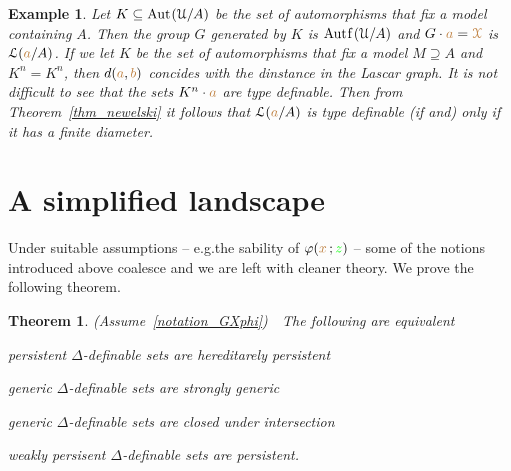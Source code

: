 \documentclass[10pt,openany]{amsproc}
\newcommand{\mylabel}[1]{{\ssf{#1}}\hfill}
\renewenvironment{itemize}
  {\begin{list}{}{%
   \setlength{\parskip}{0mm}
   \setlength{\topsep}{.2\baselineskip}
   \setlength{\rightmargin}{0mm}
   \setlength{\listparindent}{0mm}
   \setlength{\itemindent}{0mm}
   \setlength{\labelwidth}{2ex}
   \setlength{\itemsep}{.1\baselineskip}
   \setlength{\parsep}{0mm}
   \setlength{\partopsep}{0mm}
   \setlength{\labelsep}{1ex}
   \setlength{\leftmargin}{\labelwidth+\labelsep}
   \let\makelabel\mylabel
   }}
   {\vspace*{-.3\baselineskip}\end{list}}
\def\Aut{{\rm Aut\kern.15ex}}
\def\Autf{\mathord{\rm Aut\kern.15ex{f}\kern.15ex}}
\def\X{\EuScript X}
\def\U{\EuScript U}
\def\Ll{\EuScript L}
\def\<{\langle}
\def\>{\rangle}
\def\phi{\varphi}
\def\ssf#1{\textsf{\small #1}}
\newcounter{thm}
\theoremstyle{mio}
\newtheorem{theorem}[thm]{Theorem}\tcolorboxenvironment{theorem}{mythm}
\newtheorem{example}[thm]{Example}\tcolorboxenvironment{example}{mythm}
\def\mr{\color{brown}}
\def\gr{\color{green}}
\def\mrX{{\mr\X}}
\begin{document}


\begin{example}
  Let $K\subseteq\Aut(\U/A)$ be the set of automorphisms that fix a model containing $A$.
  Then the group $G$ generated by $K$ is $\Autf(\U/A)$ and $G\cdot{\mr a}=\mrX$ is $\Ll({\mr a}/A)$.
  If we let $K$ be the set of automorphisms that fix a model $M\supseteq A$ and $K^n=K^n$, then $d({\mr a},{\mr b})$ concides with the dinstance in the Lascar graph.
  It is not difficult to see that the sets $K^n\cdot{\mr a}$ are type definable.
  Then from Theorem~\ref{thm_newelski} it follows that $\Ll({\mr a}/A)$ is type definable (if and) only if it has a finite diameter.
\end{example} 

\section{A simplified landscape}

Under suitable assumptions -- e.g.\@ the sability of $\phi({\mr x}\,;{\gr z})$ -- some of the notions introduced above coalesce and we are left with cleaner theory.
We prove the following theorem.

\begin{theorem}\label{thm_coalesce}
  (Assume~\ref{notation_GXphi})\ \  
  The following are equivalent
  \begin{itemize}
    \item[1.] persistent $\Delta$-definable sets are hereditarely persistent
    \item[2.] generic $\Delta$-definable sets are strongly generic
    \item[3.] generic $\Delta$-definable sets are closed under intersection
    \item[4.] weakly persisent $\Delta$-definable sets are persistent.
  \end{itemize}
\end{theorem}
\end{document}
